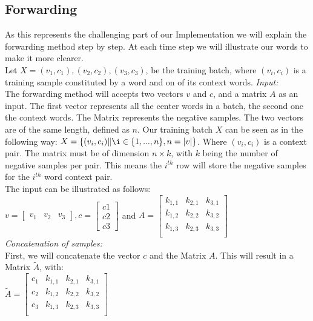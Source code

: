 \subsection{Forwarding}
As this represents the challenging part of our Implementation we will explain the forwarding method step by step. At each time step we will illustrate our words to make it more clearer.\\
Let $X = {(v_1,c_1),(v_2,c_2),(v_3,c_3)}$, be the training batch, where $(v_i,c_i)$ is a training sample constituted by a word and on of its context words. 
\textit{Input:}\\
The forwarding method will accepts two vectors $v$ and $c$, and a matrix $A$ as an input. The first vector represents all the center words in a batch, the second one the context words. The Matrix represents the negative samples. The two vectors are of the same length, defined as $n$. Our training batch $X$ can be seen as in the following way:  $X = \{(v_i, c_i)\|\i \in \{1, ..., n\}, n = |v| \}$. Where $(v_i,c_i)$ is a context pair. The matrix must be of dimension $n \times k$, with $k$ being the number of negative samples per pair. This means the $i^{th}$ row will store the negative samples for the $i^{th}$ word context pair.\\
The input can be illustrated as follows: \\

 $v = \begin{bmatrix}
v_1 & v_2 & v_3
\end{bmatrix}, c = \begin{bmatrix}
c1\\
c2\\
c3\end{bmatrix}$ and $A = 
\begin{bmatrix}
k_{1,1} & k_{2,1} & k_{3,1}\\
k_{1,2} & k_{2,2} & k_{3,2}\\
k_{1,3} & k_{2,3} & k_{3,3}\\
\end{bmatrix}$\\

\textit{Concatenation of samples:}\\
First, we will concatenate the vector $c$ and the Matrix $A$. This will result in a Matrix $\tilde{A}$, with:\\
$\tilde{A} = \begin{bmatrix}
c_1 & k_{1,1} & k_{2,1} & k_{3,1}\\
c_2 & k_{1,2} & k_{2,2} & k_{3,2}\\
c_3 & k_{1,3} & k_{2,3}& k_{3,3}\\
\end{bmatrix}$\\

